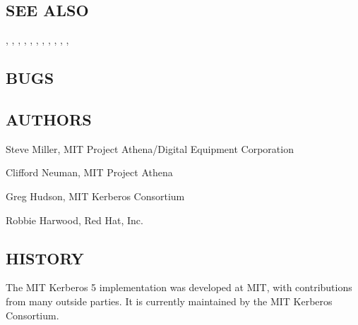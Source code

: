\documentclass[letterpaper,10pt,english]{sphinxmanual}
\begin{document}
\subsection{SEE ALSO}
\label{\detokenize{user/user_config/kerberos:see-also}}
{\hyperref[\detokenize{user/user_commands/kdestroy:kdestroy-1}]{}}, {\hyperref[\detokenize{user/user_commands/kinit:kinit-1}]{}}, {\hyperref[\detokenize{user/user_commands/klist:klist-1}]{}},
{\hyperref[\detokenize{user/user_commands/kswitch:kswitch-1}]{}}, {\hyperref[\detokenize{user/user_commands/kpasswd:kpasswd-1}]{}}, {\hyperref[\detokenize{user/user_commands/ksu:ksu-1}]{}},
, , ,
, , 


\subsection{BUGS}
\label{\detokenize{user/user_config/kerberos:bugs}}

\subsection{AUTHORS}
\label{\detokenize{user/user_config/kerberos:authors}}
\begin{DUlineblock}{0em}
\item[] Steve Miller, MIT Project Athena/Digital Equipment Corporation
\item[] Clifford Neuman, MIT Project Athena
\item[] Greg Hudson, MIT Kerberos Consortium
\item[] Robbie Harwood, Red Hat, Inc.
\end{DUlineblock}


\subsection{HISTORY}
\label{\detokenize{user/user_config/kerberos:history}}
The MIT Kerberos 5 implementation was developed at MIT, with
contributions from many outside parties.  It is currently maintained
by the MIT Kerberos Consortium.
\end{document}
